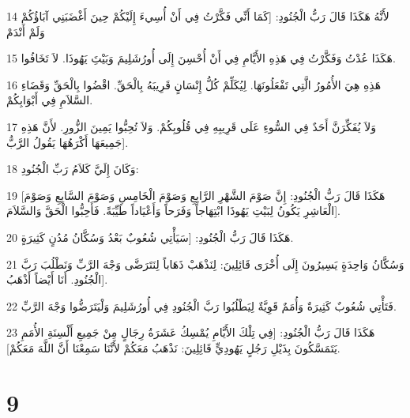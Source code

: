 \par 14 لأَنَّهُ هَكَذَا قَالَ رَبُّ الْجُنُودِ: [كَمَا أَنِّي فَكَّرْتُ فِي أَنْ أُسِيءَ إِلَيْكُمْ حِينَ أَغْضَبَنِي آبَاؤُكُمْ وَلَمْ أَنْدَمْ
\par 15 هَكَذَا عُدْتُ وَفَكَّرْتُ فِي هَذِهِ الأَيَّامِ فِي أَنْ أُحْسِنَ إِلَى أُورُشَلِيمَ وَبَيْتَِ يَهُوذَا. لاَ تَخَافُوا.
\par 16 هَذِهِ هِيَ الأُمُورُ الَّتِي تَفْعَلُونَهَا. لِيُكَلِّمْ كُلُّ إِنْسَانٍ قَرِيبَهُ بِالْحَقِّ. اقْضُوا بِالْحَقِّ وَقَضَاءِ السَّلاَمِ فِي أَبْوَابِكُمْ.
\par 17 وَلاَ يُفَكِّرَنَّ أَحَدٌ فِي السُّوءِ عَلَى قَرِيبِهِ فِي قُلُوبِكُمْ. وَلاَ تُحِبُّوا يَمِينَ الزُّورِ. لأَنَّ هَذِهِ جَمِيعَهَا أَكْرَهُهَا يَقُولُ الرَّبُّ].
\par 18 وَكَانَ إِلَيَّ كَلاَمُ رَبِّ الْجُنُودِ:
\par 19 [هَكَذَا قَالَ رَبُّ الْجُنُودِ: إِنَّ صَوْمَ الشَّهْرِ الرَّابِعِ وَصَوْمَ الْخَامِسِ وَصَوْمَ السَّابِعِ وَصَوْمَ الْعَاشِرِ يَكُونُ لِبَيْتِ يَهُوذَا ابْتِهَاجاً وَفَرَحاً وَأَعْيَاداً طَيِّبَةً. فَأَحِبُّوا الْحَقَّ وَالسَّلاَمَ].
\par 20 هَكَذَا قَالَ رَبُّ الْجُنُودِ: [سَيَأْتِي شُعُوبٌ بَعْدُ وَسُكَّانُ مُدُنٍ كَثِيرَةٍ.
\par 21 وَسُكَّانُ وَاحِدَةٍ يَسِيرُونَ إِلَى أُخْرَى قَائِلِينَ: لِنَذْهَبْ ذَهَاباً لِنَتَرَضَّى وَجْهَ الرَّبِّ وَنَطْلُبَ رَبَّ الْجُنُودِ. أَنَا أَيْضاً أَذْهَبُ].
\par 22 فَتَأْتِي شُعُوبٌ كَثِيرَةٌ وَأُمَمٌ قَوِيَّةٌ لِيَطْلُبُوا رَبَّ الْجُنُودِ فِي أُورُشَلِيمَ وَلْيَتَرَضُّوا وَجْهَ الرَّبِّ.
\par 23 هَكَذَا قَالَ رَبُّ الْجُنُودِ: [فِي تِلْكَ الأَيَّامِ يُمْسِكُ عَشَرَةُ رِجَالٍ مِنْ جَمِيعِ أَلْسِنَةِ الأُمَمِ يَتَمَسَّكُونَ بِذَيْلِ رَجُلٍ يَهُودِيٍّ قَائِلِينَ: نَذْهَبُ مَعَكُمْ لأَنَّنَا سَمِعْنَا أَنَّ اللَّهَ مَعَكُمْ].

\chapter{9}

